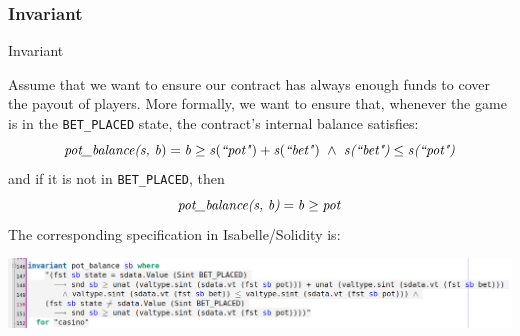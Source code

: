 \documentclass[aspectratio=169]{beamer}
\begin{document}
\subsubsection{Invariant}
\begin{frame}{Invariant}
\begin{Example}{}{}
Assume that we want to ensure our contract has always enough funds to cover the payout of players.
  More formally, we want to ensure that, whenever the game is in the \texttt{BET\_PLACED} state, the contract's internal balance satisfies:
	\begin{equation}
	  \textrm{\textit{pot\_balance(s, b}})=\textrm{\textit{b}} \ge \textrm{\textit{s}}(\textrm{\textit{``pot"}}) + \textrm{\textit{s}}(\textrm{\textit{``bet"}})~\wedge~\textrm{\textit{s}} \textrm{\textit{(``bet")}} \leq \textrm{\textit{s}}\textrm{\textit{(``pot")}}
	\end{equation}
  and if it is not in \texttt{BET\_PLACED}, then 
  \begin{equation}
		\textrm{\textit{pot\_balance(s, b)}} =\textrm{\textit{b}} \ge \textrm{\textit{pot}} 
  \end{equation}
%
The corresponding specification in Isabelle/Solidity is:
		\begin{center}\vspace{-2mm}
		\includegraphics[width=.95\textwidth]{inv_spec.png}
	\end{center}\vspace{-2mm}
\end{Example}
\end{frame}
%
\end{document}
